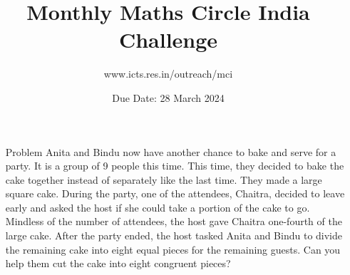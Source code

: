 \documentclass[a4paper,12pt]{article}
\title{Monthly Maths Circle India Challenge}
\author{www.icts.res.in/outreach/mci}
\date{Due Date: 28 March 2024}
\begin{document}
\maketitle
\thispagestyle{empty}
\begin{enumerate}
    \item[Problem] Anita and Bindu now have another chance to bake and serve for a party. It is a group of 9 people this time. This time, they decided to bake the cake together instead of separately like the last time. They made a large square cake. During the party, one of the attendees, Chaitra, decided to leave early and asked the host if she could take a portion of the cake to go. Mindless of the number of attendees, the host gave Chaitra one-fourth of the large cake. After the party ended, the host tasked Anita and Bindu to divide the remaining cake into eight equal pieces for the remaining guests. Can you help them cut the cake into eight congruent pieces?
    \begin{figure}[h]
        \centering
                        
    \end{figure}
\end{enumerate}
\end{document}
